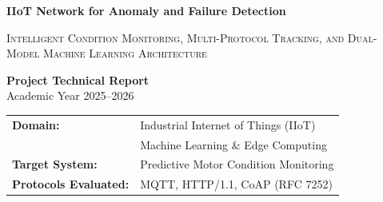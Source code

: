 \documentclass[12pt,a4paper]{report}
\begin{document}
\begin{titlepage}
    \centering
    \vspace*{1.5cm}
    
    {\Huge \bfseries IIoT Network for Anomaly and Failure Detection \par}
    \vspace{0.8cm}
    {\Large \textsc{Intelligent Condition Monitoring, Multi-Protocol Tracking, and Dual-Model Machine Learning Architecture} \par}
    
    \vspace{2.5cm}
    
    \begin{figure}[H]
        \centering
    \end{figure}
    
    \vspace{2.0cm}
    
    \textbf{\Large Project Technical Report}\\[0.4cm]
    \large Academic Year 2025--2026\\[1.5cm]
    
    \vfill
    
    \begin{tabular}{ll}
        \textbf{Domain:} & Industrial Internet of Things (IIoT) \\
        & Machine Learning \& Edge Computing \\
        \textbf{Target System:} & Predictive Motor Condition Monitoring \\
        \textbf{Protocols Evaluated:} & MQTT, HTTP/1.1, CoAP (RFC 7252) \\
    \end{tabular}
    
    \vspace{1.0cm}
\end{titlepage}
\end{document}
